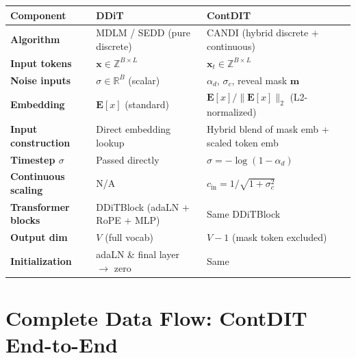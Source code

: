 \documentclass[11pt,a4paper]{article}
\begin{document}
\begin{center}
\renewcommand{\arraystretch}{1.4}
\begin{tabular}{@{}p{3.5cm}p{5cm}p{5.5cm}@{}}
\toprule
\textbf{Component} & \textbf{DDiT} & \textbf{ContDIT} \\
\midrule
\textbf{Algorithm} & MDLM / SEDD (pure discrete) & CANDI (hybrid discrete + continuous) \\
\textbf{Input tokens} & $\mathbf{x} \in \mathbb{Z}^{B \times L}$ & $\mathbf{x}_t \in \mathbb{Z}^{B \times L}$ \\
\textbf{Noise inputs} & $\sigma \in \mathbb{R}^B$ (scalar) & $\alpha_d$, $\sigma_c$, reveal mask $\mathbf{m}$ \\
\textbf{Embedding} & $\mathbf{E}[x]$ (standard) & $\mathbf{E}[x] / \|\mathbf{E}[x]\|_2$ (L2-normalized) \\
\textbf{Input construction} & Direct embedding lookup & Hybrid blend of mask emb + scaled token emb \\
\textbf{Timestep $\sigma$} & Passed directly & $\sigma = -\log(1 - \alpha_d)$ \\
\textbf{Continuous scaling} & N/A & $c_{\text{in}} = 1/\sqrt{1+\sigma_c^2}$ \\
\textbf{Transformer blocks} & DDiTBlock (adaLN + RoPE + MLP) & Same DDiTBlock \\
\textbf{Output dim} & $V$ (full vocab) & $V - 1$ (mask token excluded) \\
\textbf{Initialization} & adaLN \& final layer $\to$ zero & Same \\
\bottomrule
\end{tabular}
\end{center}

\section{Complete Data Flow: ContDIT End-to-End}
\end{document}
